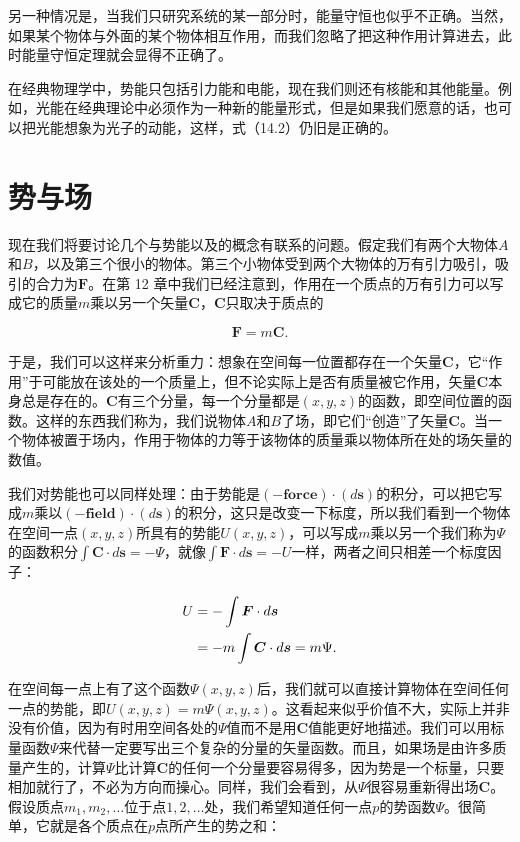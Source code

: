 \documentclass[12pt,oneside]{book}
\providecommand{\FLPvec}[1]{\boldsymbol{#1}}
\providecommand{\FLPC}[0]{\FLPvec{C}}
\providecommand{\FLPF}[0]{\FLPvec{F}}
\providecommand{\FLPs}[0]{\FLPvec{s}}
\begin{document}
另一种情况是，当我们只研究系统的某一部分时，能量守恒也似乎不正确。当然，如果某个物体与外面的某个物体相互作用，而我们忽略了把这种作用计算进去，此时能量守恒定理就会显得不正确了。

在经典物理学中，势能只包括引力能和电能，现在我们则还有核能和其他能量。例如，光能在经典理论中必须作为一种新的能量形式，但是如果我们愿意的话，也可以把光能想象为光子的动能，这样，式（14.2）仍旧是正确的。


\section{势与场}
现在我们将要讨论几个与势能以及的概念有联系的问题。假定我们有两个大物体$A$和$B$，以及第三个很小的物体。第三个小物体受到两个大物体的万有引力吸引，吸引的合力为$\FLPF$。在第 12 章中我们已经注意到，作用在一个质点的万有引力可以写成它的质量$m$乘以另一个矢量$\FLPC$，$\FLPC$只取决于质点的


\begin{equation*}
\FLPF=m\FLPC.
\end{equation*}

于是，我们可以这样来分析重力：想象在空间每一位置都存在一个矢量$\FLPC$，它“作用”于可能放在该处的一个质量上，但不论实际上是否有质量被它作用，矢量$\FLPC$本身总是存在的。$\FLPC$有三个分量，每一个分量都是$(x,y,z)$的函数，即空间位置的函数。这样的东西我们称为，我们说物体$A$和$B$了场，即它们“创造”了矢量$\FLPC$。当一个物体被置于场内，作用于物体的力等于该物体的质量乘以物体所在处的场矢量的数值。


我们对势能也可以同样处理：由于势能是$(-\textbf{force})\cdot(d\FLPs)$的积分，可以把它写成$m$乘以$(-\textbf{field})\cdot(d\FLPs)$的积分，这只是改变一下标度，所以我们看到一个物体在空间一点$(x,y,z)$所具有的势能$U(x,y,z)$，可以写成$m$乘以另一个我们称为$\Psi$的函数积分$\int\FLPC\cdot d\FLPs=-\Psi$，就像$\int\FLPF\cdot d\FLPs=-U$一样，两者之间只相差一个标度因子：


\begin{align}
\label{Eq:I:14:7}
U&=-\int\FLPF\cdot d\FLPs\notag\\
&=-m\int\FLPC\cdot d\FLPs=m\Psi.
\end{align}

在空间每一点上有了这个函数$\Psi(x,y,z)$后，我们就可以直接计算物体在空间任何一点的势能，即$U(x,y,z) = m\Psi(x,y,z)$。这看起来似乎价值不大，实际上并非没有价值，因为有时用空间各处的$\Psi$值而不是用$\FLPC$值能更好地描述。我们可以用标量函数$\Psi$来代替一定要写出三个复杂的分量的矢量函数。而且，如果场是由许多质量产生的，计算$\Psi$比计算$\FLPC$的任何一个分量要容易得多，因为势是一个标量，只要相加就行了，不必为方向而操心。同样，我们会看到，从$\Psi$很容易重新得出场$\FLPC$。假设质点$m_1, m_2, \ldots$位于点$1, 2, \ldots$处，我们希望知道任何一点$p$的势函数$\Psi$。很简单，它就是各个质点在$p$点所产生的势之和：
\end{document}
